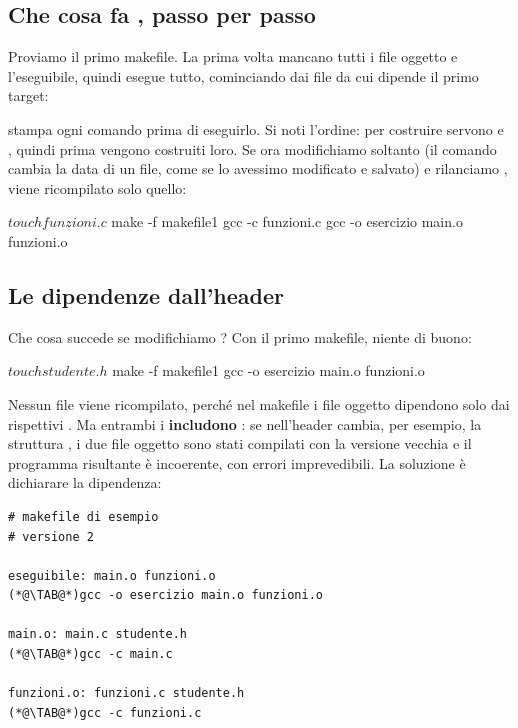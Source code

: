 \subsection{Che cosa fa , passo per passo}

Proviamo il primo makefile. La prima volta mancano tutti i file oggetto e
l'eseguibile, quindi  esegue tutto, cominciando dai file da cui
dipende il primo target:


 stampa ogni comando prima di eseguirlo. Si noti l'ordine: per
costruire  servono  e , quindi
prima vengono costruiti loro. Se ora modifichiamo soltanto
 (il comando  cambia la data di un file, come
se lo avessimo modificato e salvato) e rilanciamo , viene
ricompilato solo quello:

\begin{console}
$ touch funzioni.c
$ make -f makefile1
gcc -c funzioni.c
gcc -o esercizio main.o funzioni.o
\end{console}

\subsection{Le dipendenze dall'header}

Che cosa succede se modifichiamo ? Con il primo makefile,
niente di buono:

\begin{console}
$ touch studente.h
$ make -f makefile1
gcc -o esercizio main.o funzioni.o
\end{console}

Nessun file viene ricompilato, perché nel makefile i file oggetto dipendono
solo dai rispettivi . Ma entrambi i  \textbf{includono}
: se nell'header cambia, per esempio, la struttura
, i due file oggetto sono stati compilati con la versione
vecchia e il programma risultante è incoerente, con errori imprevedibili.
La soluzione è dichiarare la dipendenza:

\begin{lstlisting}[style=make, name=makefile2]
# makefile di esempio
# versione 2

eseguibile: main.o funzioni.o
(*@\TAB@*)gcc -o esercizio main.o funzioni.o

main.o: main.c studente.h
(*@\TAB@*)gcc -c main.c

funzioni.o: funzioni.c studente.h
(*@\TAB@*)gcc -c funzioni.c
\end{lstlisting}


